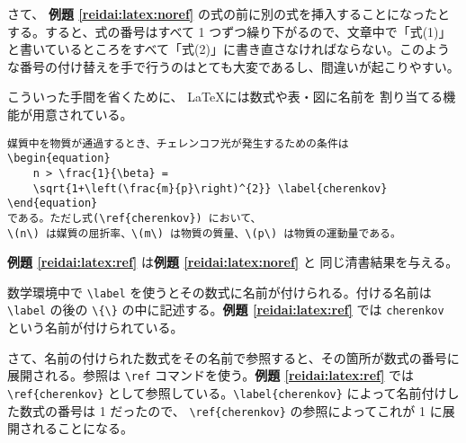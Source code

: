 さて、 \textbf{例題 \ref{reidai:latex:noref}} の式の前に別の式を挿入することになったとする。すると、式の番号はすべて 1 つずつ繰り下がるので、文章中で「式(1)」と書いているところをすべて「式(2)」に書き直さなければならない。このような番号の付け替えを手で行うのはとても大変であるし、間違いが起こりやすい。

こういった手間を省くために、 \LaTeX には数式や表・図に名前を
割り当てる機能が用意されている。
\begin{reidai}
    \label{reidai:latex:ref}
    \begin{verbatim}
媒質中を物質が通過するとき、チェレンコフ光が発生するための条件は
\begin{equation}
    n > \frac{1}{\beta} =
    \sqrt{1+\left(\frac{m}{p}\right)^{2}} \label{cherenkov}
\end{equation}
である。ただし式(\ref{cherenkov}) において、
\(n\) は媒質の屈折率、\(m\) は物質の質量、\(p\) は物質の運動量である。
\end{verbatim}
\end{reidai} \noindent
\textbf{例題 \ref{reidai:latex:ref}} は\textbf{例題 \ref{reidai:latex:noref}} と
同じ清書結果を与える。

数学環境中で \verb|\label| を使うとその数式に名前が付けられる。付ける名前は \verb|\label| の後の \verb|\{\}| の中に記述する。\textbf{例題 \ref{reidai:latex:ref}} では \texttt{cherenkov} という名前が付けられている。

さて、名前の付けられた数式をその名前で参照すると、その箇所が数式の番号に展開される。参照は \verb|\ref| コマンドを使う。\textbf{例題 \ref{reidai:latex:ref}} では \verb|\ref{cherenkov}| として参照している。\verb|\label{cherenkov}| によって名前付けした数式の番号は 1 だったので、 \verb|\ref{cherenkov}| の参照によってこれが 1 に展開されることになる。

